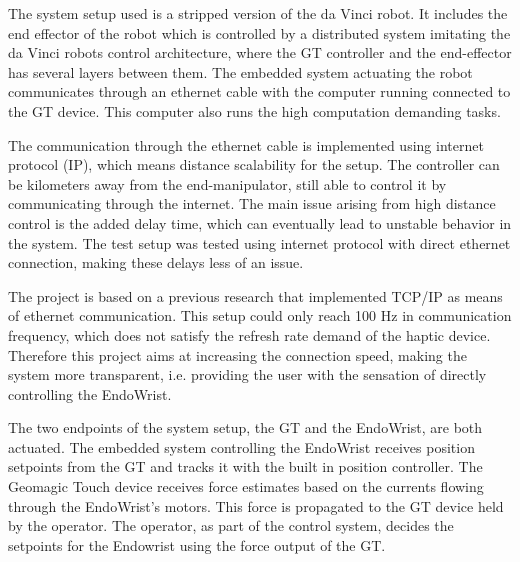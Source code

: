 The system setup used is a stripped version of the da Vinci robot. It includes the end effector of the robot which is controlled by a distributed system imitating the da Vinci robots control architecture, where the GT controller and the end-effector has several layers between them. The embedded system actuating the robot communicates through an ethernet cable with the computer running connected to the GT device. This computer also runs the high computation demanding tasks.

The communication through the ethernet cable is implemented using internet protocol (IP), which means distance scalability for the setup. The controller can be kilometers away from the end-manipulator, still able to control it by communicating through the internet. The main issue arising from high distance control is the added delay time, which can eventually lead to unstable behavior in the system. The test setup was tested using internet protocol with direct ethernet connection, making these delays less of an issue.

The project is based on a previous research that implemented TCP/IP as means of ethernet communication. This setup could only reach 100 Hz in communication frequency, which does not satisfy the refresh rate demand of the haptic device\cite{Chris_Surgical}\cite{coles2011role}. Therefore this project aims at increasing the connection speed, making the system more transparent, i.e. providing the user with the sensation of directly controlling the EndoWrist.

The two endpoints of the system setup, the GT and the EndoWrist, are both actuated. The embedded system controlling the EndoWrist receives position setpoints from the GT and tracks it with the built in position controller.
The Geomagic Touch device receives force estimates based on the currents flowing through the EndoWrist's motors. This force is propagated to the GT device held by the operator. The operator, as part of the control system, decides the setpoints for the Endowrist using the force output of the GT. %



%